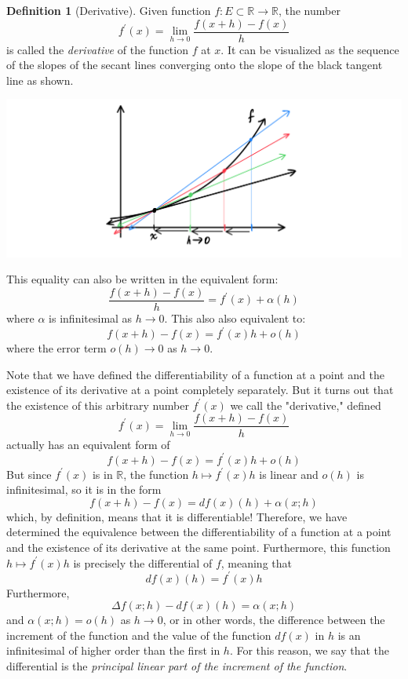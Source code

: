 \documentclass{article}
\theoremstyle{remark}
\theoremstyle{definition}
\newtheorem{definition}{Definition}[section]
\begin{document}
\begin{definition}[Derivative]
Given function $f: E \subset \mathbb{R} \longrightarrow \mathbb{R}$, the number
\[f^\prime (x) = \lim_{h \rightarrow 0} \frac{f(x+h) - f(x)}{h}\]
is called the \textit{derivative} of the function $f$ at $x$. It can be visualized as the sequence of the slopes of the secant lines converging onto the slope of the black tangent line as shown. 
\begin{center}
    \includegraphics[scale=0.27]{img/Tangent_Lines_Converging.PNG}
\end{center}
This equality can also be written in the equivalent form: 
\[\frac{f(x+h) - f(x)}{h} = f^\prime (x) + \alpha (h)\]
where $\alpha$ is infinitesimal as $h \rightarrow 0$. This also also equivalent to:
\[f(x+h) - f(x) = f^\prime (x) h + o (h)\]
where the error term $o(h) \rightarrow 0$ as $h \rightarrow 0$. 
\end{definition}

Note that we have defined the differentiability of a function at a point and the existence of its derivative at a point completely separately. But it turns out that the existence of this arbitrary number $f^\prime (x)$ we call the "derivative," defined
\[f^\prime (x) = \lim_{h \rightarrow 0} \frac{f(x + h) - f(x)}{h}\]
actually has an equivalent form of 
\[f(x + h) - f(x) = f^\prime (x) h + o(h)\]
But since $f^\prime(x)$ is in $\mathbb{R}$, the function $h \mapsto f^\prime (x) h$ is linear and $o(h)$ is infinitesimal, so it is in the form 
\[f(x + h) - f(x) = df (x) (h) + \alpha(x; h)\]
which, by definition, means that it is differentiable! Therefore, we have determined the equivalence between the differentiability of a function at a point and the existence of its derivative at the same point. Furthermore, this function $h \mapsto f^\prime (x) h$ is precisely the differential of $f$, meaning that
\[df (x) (h) = f^\prime (x) h\]
Furthermore, 
\[\Delta f(x; h) - df(x)(h) = \alpha (x; h)\]
and $\alpha(x;h) = o (h)$ as $h \rightarrow 0$, or in other words, the difference between the increment of the function and the value of the function $df(x)$ in $h$ is an infinitesimal of higher order than the first in $h$. For this reason, we say that the differential is the \textit{principal linear part of the increment of the function}. 
\end{document}
